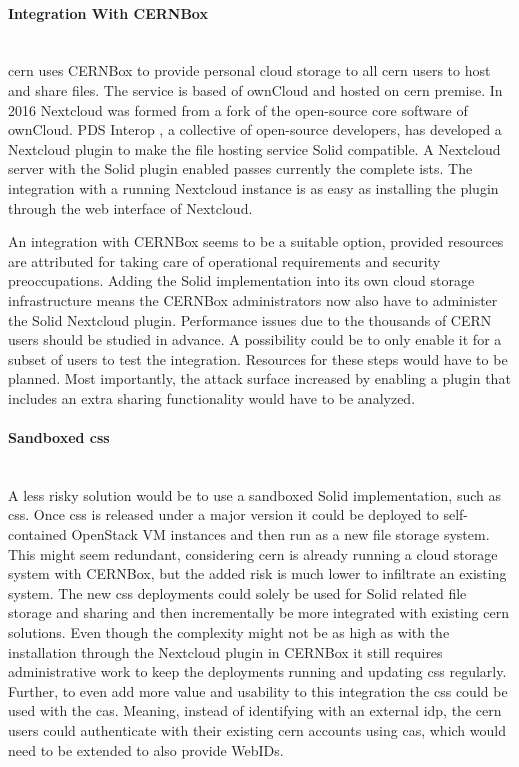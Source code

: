 \paragraph{Integration With CERNBox}\mbox{}\\

\gls{cern} uses CERNBox \cite{cernbox} to provide personal cloud storage to all \gls{cern} users to host and share files. The service is based of ownCloud \cite{owncloud} and hosted on \gls{cern} premise. In 2016 Nextcloud \cite{nextcloud} was formed from a fork of the open-source core software of ownCloud. PDS Interop \cite{pds-interop}, a collective of open-source developers, has developed a Nextcloud \cite{nextcloud} plugin to make the file hosting service Solid compatible. A Nextcloud server with the Solid plugin enabled passes currently the complete \gls{ists}. The integration with a running Nextcloud instance is as easy as installing the plugin through the web interface of Nextcloud.

An integration with CERNBox seems to be a suitable option, provided resources are attributed for taking care of operational requirements and security preoccupations. Adding the Solid implementation into its own cloud storage infrastructure means the CERNBox administrators now also have to administer the Solid Nextcloud plugin. Performance issues due to the thousands of CERN users should be studied in advance. A possibility could be to only enable it for a subset of users to test the integration. Resources for these steps would have to be planned. Most importantly, the attack surface increased by enabling a plugin that includes an extra sharing functionality would have to be analyzed.
\vspace{0.5cm}
\paragraph{Sandboxed \gls{css}}\mbox{}\\

A less risky solution would be to use a sandboxed Solid implementation, such as \gls{css}. Once \gls{css} is released under a major version it could be deployed to self-contained OpenStack VM instances and then run as a new file storage system. This might seem redundant, considering \gls{cern} is already running a cloud storage system with CERNBox, but the added risk is much lower to infiltrate an existing system. The new \gls{css} deployments could solely be used for Solid related file storage and sharing and then incrementally be more integrated with existing \gls{cern} solutions. Even though the complexity might not be as high as with the installation through the Nextcloud plugin in CERNBox it still requires administrative work to keep the deployments running and updating \gls{css} regularly. Further, to even add more value and usability to this integration the \gls{css} could be used with the \gls{cas}. Meaning, instead of identifying with an external \gls{idp}, the \gls{cern} users could authenticate with their existing \gls{cern} accounts using \gls{cas}, which would need to be extended to also provide WebIDs.

